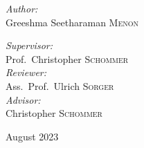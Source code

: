 \begin{titlepage}
\begin{center}
\vspace{4cm}
\begin{minipage}[t]{0.4\textwidth}
\begin{flushleft} \large
\emph{Author:}\\
Greeshma Seetharaman \textsc{Menon}
\end{flushleft}
\end{minipage}
\begin{minipage}[t]{0.4\textwidth}
\begin{flushright} \large
\emph{Supervisor:} \\
Prof.~Christopher \textsc{Schommer} \\
\vspace{.5em}
\emph{Reviewer:} \\
Ass.~Prof.~Ulrich \textsc{Sorger} \\
\vspace{.5em}
\emph{Advisor:} \\
Christopher \textsc{Schommer}
\end{flushright}
\end{minipage}

\vfill

{\large August 2023}

\end{center}

\end{titlepage}